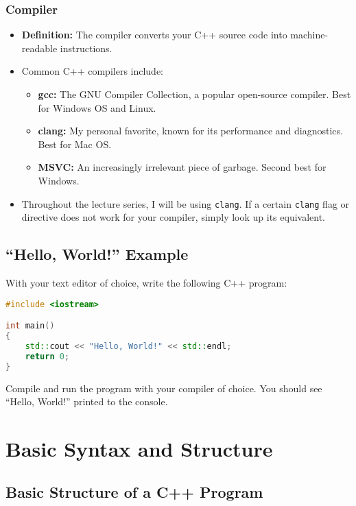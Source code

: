 \documentclass{article}
\begin{document}
\subsubsection{Compiler}

\begin{itemize}
	\item \textbf{Definition:} The compiler converts your C++ source code into machine-readable instructions.
	\item Common C++ compilers include:
	\begin{itemize}
		\item \textbf{gcc:} The GNU Compiler Collection, a popular open-source compiler. Best for Windows OS and Linux.
		\item \textbf{clang:} My personal favorite, known for its performance and diagnostics. Best for Mac OS.
		\item \textbf{MSVC:} An increasingly irrelevant piece of garbage. Second best for Windows.
	\end{itemize}
	\item Throughout the lecture series, I will be using \texttt{clang}. If a certain \texttt{clang} flag or directive does not work for your compiler, simply look up its equivalent.
\end{itemize}

\subsection{``Hello, World!'' Example}

\noindent
With your text editor of choice, write the following C++ program:

\begin{lstlisting}[language=C++]
#include <iostream>

int main()
{
	std::cout << "Hello, World!" << std::endl;
	return 0;
}
\end{lstlisting}

\noindent
Compile and run the program with your compiler of choice. You should see ``Hello, World!'' printed to the console.

\section{Basic Syntax and Structure}

\subsection{Basic Structure of a C++ Program}
\end{document}
